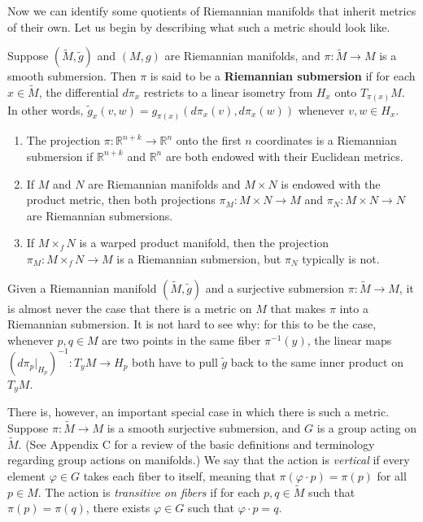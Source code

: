 Now we can identify some quotients of Riemannian manifolds that inherit metrics of their own. Let us begin by describing what such a metric should look like.

Suppose $(\tilde{M},\tilde{g})$ and $(M,g)$ are Riemannian manifolds, and $\pi: \tilde{M} \to M$ is a smooth submersion. Then $\pi$ is said to be a \textbf{Riemannian submersion} if for each $x \in \tilde{M}$, the differential $d\pi_x$ restricts to a linear isometry from $H_x$ onto $T_{\pi(x)}M$. In other words, $\tilde{g}_x(v,w) = g_{\pi(x)}(d\pi_x(v), d\pi_x(w))$ whenever $v,w \in H_x$.

\begin{example}
\label{ex:riemannian-submersions}
\begin{enumerate}
\item[(a)] The projection $\pi: \mathbb{R}^{n+k} \to \mathbb{R}^n$ onto the first $n$ coordinates is a Riemannian submersion if $\mathbb{R}^{n+k}$ and $\mathbb{R}^n$ are both endowed with their Euclidean metrics.
\item[(b)] If $M$ and $N$ are Riemannian manifolds and $M \times N$ is endowed with the product metric, then both projections $\pi_M: M \times N \to M$ and $\pi_N: M \times N \to N$ are Riemannian submersions.
\item[(c)] If $M \times_f N$ is a warped product manifold, then the projection $\pi_M : M \times_f N \to M$ is a Riemannian submersion, but $\pi_N$ typically is not.
\end{enumerate}
\end{example}

Given a Riemannian manifold $(\tilde{M}, \tilde{g})$ and a surjective submersion $\pi: \tilde{M} \to M$, it is almost never the case that there is a metric on $M$ that makes $\pi$ into a Riemannian submersion. It is not hard to see why: for this to be the case, whenever $p, q \in M$ are two points in the same fiber $\pi^{-1}(y)$, the linear maps $(d\pi_p|_{H_p})^{-1}: T_y M \to H_p$ both have to pull $\tilde{g}$ back to the same inner product on $T_y M$.

There is, however, an important special case in which there is such a metric. Suppose $\pi: \tilde{M} \to M$ is a smooth surjective submersion, and $G$ is a group acting on $\tilde{M}$. (See Appendix C for a review of the basic definitions and terminology regarding group actions on manifolds.) We say that the action is \emph{vertical} if every element $\varphi \in G$ takes each fiber to itself, meaning that $\pi(\varphi \cdot p) = \pi(p)$ for all $p \in M$. The action is \emph{transitive on fibers} if for each $p, q \in \tilde{M}$ such that $\pi(p) = \pi(q)$, there exists $\varphi \in G$ such that $\varphi \cdot p = q$.

